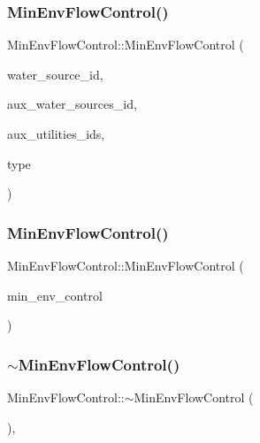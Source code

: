 \subsubsection{\texorpdfstring{Min\+Env\+Flow\+Control()}{MinEnvFlowControl()}\hspace{0.1cm}{\footnotesize\ttfamily [1/2]}}
{\footnotesize\ttfamily Min\+Env\+Flow\+Control\+::\+Min\+Env\+Flow\+Control (\begin{DoxyParamCaption}\item[{int}]{water\+\_\+source\+\_\+id,  }\item[{const vector$<$ int $>$ \&}]{aux\+\_\+water\+\_\+sources\+\_\+id,  }\item[{const vector$<$ int $>$ \&}]{aux\+\_\+utilities\+\_\+ids,  }\item[{int}]{type }\end{DoxyParamCaption})}

\mbox{\label{classMinEnvFlowControl_a0e12d2b8583a539d200acfc5fac795b6_a0e12d2b8583a539d200acfc5fac795b6}} 
\subsubsection{\texorpdfstring{Min\+Env\+Flow\+Control()}{MinEnvFlowControl()}\hspace{0.1cm}{\footnotesize\ttfamily [2/2]}}
{\footnotesize\ttfamily Min\+Env\+Flow\+Control\+::\+Min\+Env\+Flow\+Control (\begin{DoxyParamCaption}\item[{const \mbox{\hyperlink{classMinEnvFlowControl}{Min\+Env\+Flow\+Control}} \&}]{min\+\_\+env\+\_\+control }\end{DoxyParamCaption})}

\mbox{\label{classMinEnvFlowControl_a809d1552ea730c607dbc73937eb70a6a_a809d1552ea730c607dbc73937eb70a6a}} 
\subsubsection{\texorpdfstring{$\sim$\+Min\+Env\+Flow\+Control()}{~MinEnvFlowControl()}}
{\footnotesize\ttfamily Min\+Env\+Flow\+Control\+::$\sim$\+Min\+Env\+Flow\+Control (\begin{DoxyParamCaption}{ }\end{DoxyParamCaption})\hspace{0.3cm}{\ttfamily [virtual]}, {\ttfamily [default]}}




